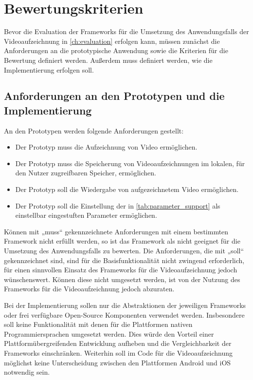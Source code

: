 \chapter{Bewertungskriterien}
\label{ch:bewertungskriterien}

Bevor die Evaluation der Frameworks für die Umsetzung des Anwendungsfalls der Videoaufzeichnung in \autoref{ch:evaluation} erfolgen kann, müssen zunächst die Anforderungen an die prototypische Anwendung sowie die Kriterien für die Bewertung definiert werden. 
Außerdem muss definiert werden, wie die Implementierung erfolgen soll.

\section{Anforderungen an den Prototypen und die Implementierung}
\label{sec:anforderungen}

An den Prototypen werden folgende Anforderungen gestellt:
\begin{itemize}
  \item Der Prototyp muss die Aufzeichnung von Video ermöglichen.
  \item Der Prototyp muss die Speicherung von Videoaufzeichnungen im lokalen, für den Nutzer zugreifbaren Speicher, ermöglichen.
  \item Der Prototyp soll die Wiedergabe von aufgezeichnetem Video ermöglichen.
  \item Der Prototyp soll die Einstellung der in \autoref{tab:parameter_support} als einstellbar eingestuften Parameter ermöglichen.
\end{itemize}

Können mit „muss“ gekennzeichnete Anforderungen mit einem bestimmten Framework nicht erfüllt werden, so ist das Framework als nicht geeignet für die Umsetzung des Anwendungsfalls zu bewerten.
Die Anforderungen, die mit „soll“ gekennzeichnet sind, sind für die Basisfunktionalität nicht zwingend erforderlich, für einen sinnvollen Einsatz des Frameworks für die Videoaufzeichnung jedoch wünschenswert.
Können diese nicht umgesetzt werden, ist von der Nutzung des Frameworks für die Videoaufzeichnung jedoch abzuraten.

Bei der Implementierung sollen nur die Abstraktionen der jeweiligen Frameworks oder frei verfügbare Open-Source Komponenten verwendet werden.
Insbesondere soll keine Funktionalität mit denen für die Plattformen nativen Programmiersprachen umgesetzt werden.
Dies würde den Vorteil einer Plattformübergreifenden Entwicklung aufheben und die Vergleichbarkeit der Frameworks einschränken.
Weiterhin soll im Code für die Videoaufzeichnung möglichst keine Unterscheidung zwischen den Plattformen Android und iOS notwendig sein.


